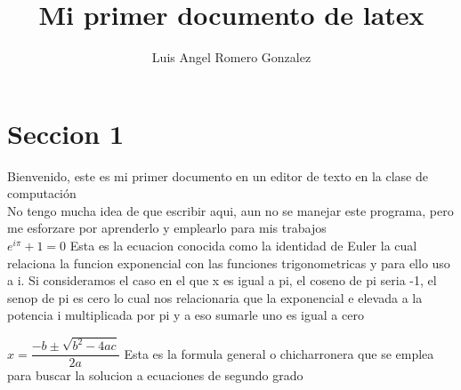 \documentclass[a4paper,10pt]{article}
\title{Mi primer documento de latex} %
\author{Luis Angel Romero Gonzalez} %
\begin{document}
\maketitle

% 

\section{Seccion 1}

Bienvenido, este es mi primer documento en un editor de texto en la clase de computación \\ %

No tengo mucha idea de que escribir aqui, aun no se manejar este programa, pero me esforzare por aprenderlo y emplearlo para mis trabajos\\ %

$ e^{i \pi} + 1 = 0 $  Esta es la ecuacion conocida como la identidad de Euler la cual relaciona la funcion exponencial con las funciones trigonometricas y para ello uso a i. Si consideramos el caso en el que x es igual a pi, el coseno de pi seria -1, el senop de pi es cero lo cual nos relacionaria que la exponencial e elevada a la potencia i multiplicada por pi y a eso sumarle uno es igual a cero%

$ x = \dfrac{-b \pm \sqrt{b^2 - 4ac}}{2a}$ Esta es la formula general o chicharronera que se emplea para buscar la solucion a ecuaciones de segundo grado
\end{document}
